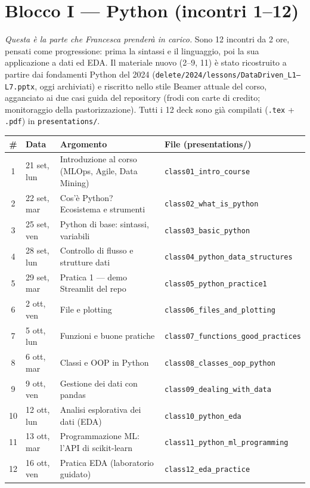 \documentclass[11pt,a4paper]{article}
\begin{document}
\section{Blocco I --- Python (incontri 1--12)}

\textit{Questa è la parte che Francesca prenderà in carico.} Sono 12 incontri da 2 ore, pensati come progressione: prima la sintassi e il linguaggio, poi la sua applicazione a dati ed EDA. Il materiale nuovo (2--9, 11) è stato ricostruito a partire dai fondamenti Python del 2024 (\texttt{delete/2024/lessons/DataDriven\_L1--L7.pptx}, oggi archiviati) e riscritto nello stile Beamer attuale del corso, agganciato ai due casi guida del repository (frodi con carte di credito; monitoraggio della pastorizzazione). Tutti i 12 deck sono già compilati (\texttt{.tex} + \texttt{.pdf}) in \texttt{presentations/}.

\begin{center}
\begin{tabularx}{\textwidth}{@{}c l X l@{}}
\toprule
\textbf{\#} & \textbf{Data} & \textbf{Argomento} & \textbf{File (presentations/)} \\
\midrule
1 & 21 set, lun & Introduzione al corso (MLOps, Agile, Data Mining) & \texttt{class01\_intro\_course} \\
2 & 22 set, mar & Cos'è Python? Ecosistema e strumenti & \texttt{class02\_what\_is\_python} \\
3 & 25 set, ven & Python di base: sintassi, variabili & \texttt{class03\_basic\_python} \\
4 & 28 set, lun & Controllo di flusso e strutture dati & \texttt{class04\_python\_data\_structures} \\
5 & 29 set, mar & Pratica 1 --- demo Streamlit del repo & \texttt{class05\_python\_practice1} \\
6 & 2 ott, ven & File e plotting & \texttt{class06\_files\_and\_plotting} \\
7 & 5 ott, lun & Funzioni e buone pratiche & \texttt{class07\_functions\_good\_practices} \\
8 & 6 ott, mar & Classi e OOP in Python & \texttt{class08\_classes\_oop\_python} \\
9 & 9 ott, ven & Gestione dei dati con pandas & \texttt{class09\_dealing\_with\_data} \\
10 & 12 ott, lun & Analisi esplorativa dei dati (EDA) & \texttt{class10\_python\_eda} \\
11 & 13 ott, mar & Programmazione ML: l'API di scikit-learn & \texttt{class11\_python\_ml\_programming} \\
12 & 16 ott, ven & Pratica EDA (laboratorio guidato) & \texttt{class12\_eda\_practice} \\
\bottomrule
\end{tabularx}
\end{center}
\end{document}
